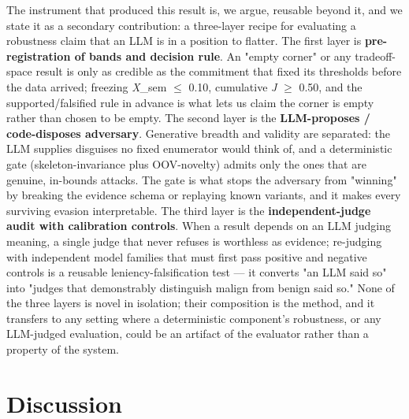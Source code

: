 \documentclass[sigconf,anonymous,review]{acmart}
\begin{document}
The instrument that produced this result is, we argue, reusable beyond it, and we state it as a secondary contribution: a three-layer recipe for evaluating a robustness claim that an LLM is in a position to flatter. The first layer is \textbf{pre-registration of bands and decision rule}. An "empty corner" or any tradeoff-space result is only as credible as the commitment that fixed its thresholds before the data arrived; freezing \textit{X}\_sem $\leq$ 0.10, cumulative \textit{J} $\geq$ 0.50, and the supported/falsified rule in advance is what lets us claim the corner is empty rather than chosen to be empty. The second layer is the \textbf{LLM-proposes / code-disposes adversary}. Generative breadth and validity are separated: the LLM supplies disguises no fixed enumerator would think of, and a deterministic gate (skeleton-invariance plus OOV-novelty) admits only the ones that are genuine, in-bounds attacks. The gate is what stops the adversary from "winning" by breaking the evidence schema or replaying known variants, and it makes every surviving evasion interpretable. The third layer is the \textbf{independent-judge audit with calibration controls}. When a result depends on an LLM judging meaning, a single judge that never refuses is worthless as evidence; re-judging with independent model families that must first pass positive and negative controls is a reusable leniency-falsification test --- it converts "an LLM said so" into "judges that demonstrably distinguish malign from benign said so." None of the three layers is novel in isolation; their composition is the method, and it transfers to any setting where a deterministic component's robustness, or any LLM-judged evaluation, could be an artifact of the evaluator rather than a property of the system.


\section{Discussion}
\end{document}
